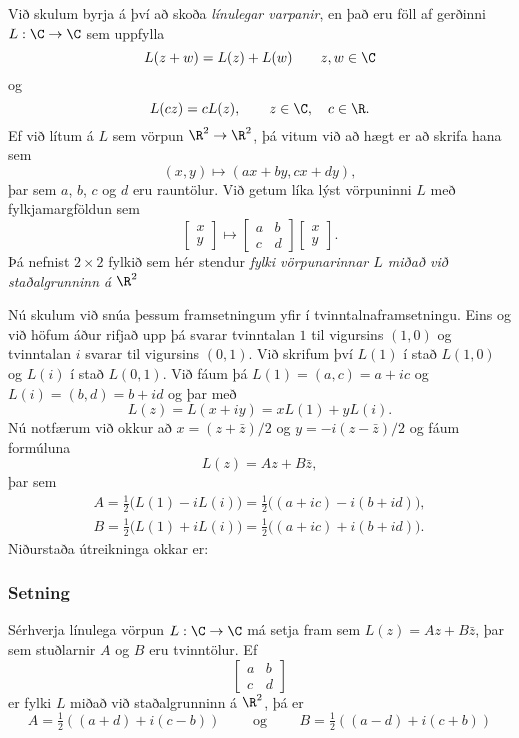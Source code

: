 Við skulum  byrja á því að skoða {\it  línulegar
varpanir}, en það eru
föll af gerðinni $L:\C\to \C$ sem uppfylla
$$
L(z+w)=L(z)+L(w) \qquad z,w\in \C
$$
og
$$
L(cz)=cL(z), \qquad z\in \C, \quad c\in \R.
$$
Ef við lítum á $L$ sem vörpun $\R^2\to \R^2$, þá vitum við að hægt er að
skrifa hana sem
\begin{equation*}
(x,y)\mapsto (ax+by, cx+dy),
\end{equation*}
þar sem $a$, $b$,  $c$ og $d$ eru rauntölur.  Við getum líka lýst
vörpuninni $L$ með fylkjamargföldun sem 
\begin{equation*}
\left[\begin{matrix} x\\ y\end{matrix} \right]\mapsto
\left[\begin{matrix} a & b\\ c & d\end{matrix} \right]
\left[\begin{matrix} x\\ y\end{matrix} \right].
\end{equation*}
Þá nefnist $2\times 2$ fylkið sem hér stendur 
{\it fylki vörpunarinnar $L$ miðað við staðalgrunninn á $\R^2$}

Nú skulum við snúa þessum framsetningum yfir í tvinntalnaframsetningu.
Eins og við höfum áður rifjað upp þá svarar
tvinntalan $1$ til vigursins  $(1,0)$ og tvinntalan $i$ svarar til
vigursins $(0,1)$.  Við skrifum því $L(1)$ í stað $L(1,0)$ og $L(i)$ í
stað $L(0,1)$.  Við fáum þá $L(1)=(a,c)=a+ic$ og
$L(i)=(b,d)=b+id$ og þar með
$$
L(z)=L(x+iy)=xL(1)+yL(i).
$$
Nú notfærum við okkur að $x=(z+\bar z)/2$ og $y=-i(z-\bar
z)/2$ og fáum formúluna
\begin{equation*}
L(z)=Az+B\bar z,
\end{equation*}
þar sem
\begin{align*}
A=\tfrac 12\big(L(1)-iL(i)\big)
=\tfrac 12\big((a+ic)-i(b+id)\big),\\
B=\tfrac 12\big(L(1)+iL(i)\big)
=\tfrac 12\big((a+ic)+i(b+id)\big).
\end{align*}
Niðurstaða útreikninga okkar er:

\subsubsection{Setning}  Sérhverja línulega vörpun $L:\C\to\C$
má setja fram sem $L(z)=Az+B\bar z$, þar sem stuðlarnir
$A$ og $B$ eru tvinntölur.  Ef 
$$
\left[\begin{matrix} a & b\\ c & d\end{matrix} \right]
$$
er fylki $L$ miðað við staðalgrunninn á $\R^2$, þá er
$$
A=\tfrac 12((a+d)+i(c-b)) \qquad \text{ og } \qquad
B= \tfrac 12((a-d)+i(c+b))
$$




